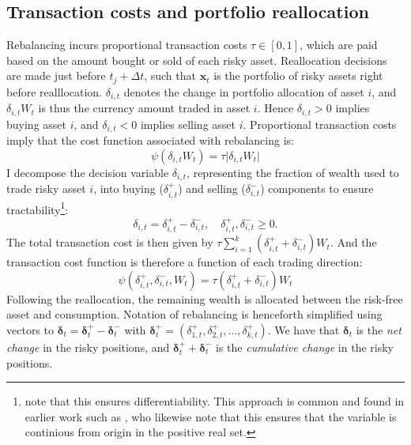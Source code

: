 \documentclass[11pt]{article}
\begin{document}
\subsection{Transaction costs and portfolio reallocation} \label{Subsection: Transaction-costs}
Rebalancing incurs proportional transaction costs \(\tau \in [0,1]\), which are paid based on
the amount bought or sold of each risky asset. 
Reallocation decisions are made just before \(t_j + \Delta t\), such that \( \mathbf{x}_{t} \)
is the portfolio of risky assets right before realllocation.
\(\delta_{i,t}\) denotes the change in portfolio allocation of asset \( i \),
and \(\delta_{i,t} W_{t}\) is thus the currency amount traded in asset \(i\).
Hence \(\delta_{i,t} >0 \) implies buying asset \(i\), and \(\delta_{i,t} <0 \) implies selling asset \(i\).
Proportional transaction costs imply that the cost function associated with rebalancing is:
\begin{equation} 
  \label{eq:Prop_Transaction_Cost}
  \psi (\delta_{i,t} W_t ) = \tau \lvert \delta_{i,t} W_t \rvert 
\end{equation}
I decompose the decision variable \(\delta_{i,t}\), representing the fraction of wealth used to trade
risky asset \(i\), into buying (\(\delta^+_{i,t}\)) and selling (\(\delta^-_{i,t}\)) components 
to ensure tractability\footnote{\textcite{Scheidegger2023} note that this ensures differentiability.
This approach is common and found in earlier work such as \textcite{Aikan1996}, 
who likewise note that this ensures that the variable is continious from origin in the positive real set.}:
\[
\delta_{i,t} = \delta^+_{i,t} - \delta^-_{i,t}, \quad \delta^+_{i,t}, \delta^-_{i,t} \geq 0.
\]
The total transaction cost is then given by \(\tau \sum_{i=1}^k (\delta^+_{i,t} + \delta^-_{i,t}) W_t\).
And the transaction cost function is therefore a function of each trading direction:
\begin{equation} 
  \label{eq:Prop_Transaction_Cost_Direction}
  \psi (\delta^{+}_{i,t}, \delta^{-}_{i,t} , W_t ) = \tau (\delta^{+}_{i,t} + \delta^{-}_{i,t} ) W_t 
\end{equation}
Following the reallocation, the remaining wealth is allocated between the risk-free asset and consumption.
Notation of rebalancing is henceforth simplified using vectors to \(\boldsymbol{\delta}_t = \boldsymbol{\delta}^+_{t} - \boldsymbol{\delta}^-_{t} \)
with \( \boldsymbol{\delta}^+_{t} = (\delta^{+}_{1,t} ,  \delta^{+}_{2,t} , \ldots ,  \delta^{+}_{k,t} ) \).
We have that \(\boldsymbol{\delta}_t \) is the \textit{net change} in the risky positions, and \(\boldsymbol{\delta}^+_{t} + \boldsymbol{\delta}^-_{t} \) is 
the \textit{cumulative change} in the risky positions. 
\end{document}
